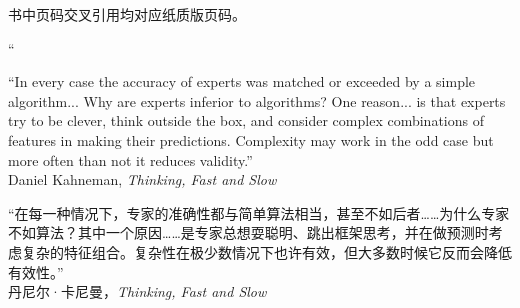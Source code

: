 \vspace{0.65em} \begin{chineseblock}书中页码交叉引用均对应纸质版页码。
\par \end{chineseblock}
\endgroup \normalsize

\clearpage \thispagestyle{empty} \begin{center} \vspace*{0.25\textheight} \begin{minipage}{0.68\textwidth} \raggedright {\color{bookaccent!22}\fontsize{52}{52}\selectfont\bookdisplayfont`` \par } \vspace{-0.4em} \small \begin{englishblock} ``In every case the accuracy of experts was matched or exceeded by a simple algorithm... Why are experts inferior to algorithms? One reason... is that experts try to be clever, think outside the box, and consider complex combinations of features in making their predictions. Complexity may work in the odd case but more often than not it reduces validity.''\\[1.5em]
Daniel Kahneman, \textit{Thinking, Fast and Slow}\\[1.5em]
\end{englishblock}
\begin{chineseblock}“在每一种情况下，专家的准确性都与简单算法相当，甚至不如后者……为什么专家不如算法？其中一个原因……是专家总想耍聪明、跳出框架思考，并在做预测时考虑复杂的特征组合。复杂性在极少数情况下也许有效，但大多数时候它反而会降低有效性。”\\[1.5em]
丹尼尔·卡尼曼，\textit{Thinking, Fast and Slow} \end{chineseblock}
\vspace{0.9em} \bookornament \end{minipage}
\end{center}

\endgroup
